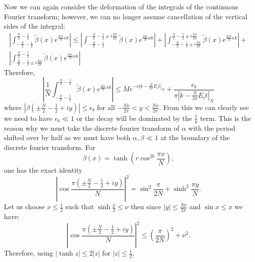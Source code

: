 \documentclass[aps,floatfix,10pt,amssymb,amsfont,amsmath,superscriptaddress,float,nofootinbib,longbibliography,nobalancelastpage,twocolumn]{revtex4-2}
\begin{document}
Now we can again consider the deformation of the integrals of the continuous Fourier transform; however, we can no longer assume cancellation of the vertical sides of the integral:
\begin{multline}
     \left|\int_{-\frac{N}{2}-\frac{1}{2}}^{\frac{N}{2}-\frac{1}{2}}\tilde\beta(x)e^{\frac{2\pi i}{N}xk}\right| \leq \left|\int_{-\frac{N}{2}-\frac{1}{2}}^{-\frac{N}{2}-\frac{1}{2}\pm i\frac{N\nu}{2\pi}}\tilde\beta(x)e^{\frac{2\pi i}{N}xk}\right|+\left|\int_{-\frac{N}{2}-\frac{1}{2}\pm i\frac{N\nu}{2\pi}}^{\frac{N}{2}-\frac{1}{2}\pm i\frac{N\nu}{2\pi}}\tilde\beta(x)e^{\frac{2\pi i}{N}xk}\right|+\\\left|\int_{\frac{N}{2}-\frac{1}{2}\pm i \frac{N\nu}{2\pi}}^{\frac{N}{2}-\frac{1}{2}}\tilde\beta(x)e^{\frac{2\pi i}{N}xk}\right|
\end{multline}
Therefore,
\begin{equation}
    \left|\frac{1}{N}\int_{-\frac{N}{2}-\frac{1}{2}}^{\frac{N}{2}-\frac{1}{2}}\tilde\beta(x)e^{\frac{2\pi i}{N}xk}\right| \leq Me^{-\nu|k-\frac{N}{2\pi}E_i t|_{N}} + \frac{\epsilon_b}{\pi|k-\frac{N}{2\pi}E_i t|_{N}}
    \label{eq:noninteger3}
\end{equation}
where $|\beta(\pm\frac{N}{2}-\frac{1}{2}+iy)| \leq\epsilon_b$ for all $-\frac{N\nu}{2\pi}<y<\frac{N\nu}{2\pi}$. From this we can clearly see we need to have $\epsilon_b \ll 1$ or the decay will be dominated by the $\frac{1}{k}$ term. This is the reason why we must take the discrete fourier transform of $\alpha$ with the period shifted over by half as we must have both $\alpha, \beta \ll 1$ at the boundary of the discrete fourier transform. For
\begin{equation}
\beta(x)=\tanh\!\left(r\cos^{2b}\frac{\pi x}{N}\right),
\label{eq:betadefinitionvertical}
\end{equation}
one has the exact identity
\begin{equation}
\left|
\cos\frac{\pi\left(\pm\frac{N}{2}-\frac12+iy\right)}{N}
\right|^2
=
\sin^2\frac{\pi}{2N}
+\sinh^2\frac{\pi y}{N}.
\label{eq:verticalcosineidentity}
\end{equation}
Let us choose $\nu \leq \frac{1}{2}$ such that $\sinh \frac{\nu}{2} \leq \nu$ then since $|y|\leq\frac{N\nu}{2\pi}$ and $\sin x\leq x$ we have:
\begin{equation}
\left|
\cos\frac{\pi\left(\pm\frac{N}{2}-\frac12+iy\right)}{N}
\right|^2
\leq
\left(\frac{\pi}{2N}\right)^2+\nu^2.
\label{eq:verticalcosinebound}
\end{equation}
Therefore, using $|\tanh z|\leq2|z|$ for $|z|\leq\frac12$,
\end{document}
